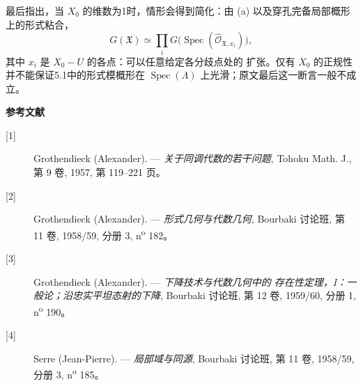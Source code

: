 最后指出，当 $X_0$ 的维数为1时，情形会得到简化：由 (a) 以及穿孔完备局部概形上的形式粘合，
\[
  G(\mathfrak X)\simeq
  \prod_iG\bigl(\operatorname{Spec}(\widehat{\mathcal O}_{\mathfrak X,x_i})\bigr),
\]
其中 $x_i$ 是 $X_0-U$ 的各点：可以任意给定各分歧点处的
扩张。仅有 $X_0$ 的正规性并不能保证5.1中的形式模概形在 $\operatorname{Spec}(\Lambda)$ 上光滑；原文最后这一断言一般不成立。

\begin{center}
  \textbf{参考文献}
\end{center}

\begin{description}
  \item[{[1]}] Grothendieck (Alexander). --- \emph{关于同调代数的若干问题},
    Tohoku Math. J., 第 9 卷, 1957, 第 119--221 页。
  \item[{[2]}] Grothendieck (Alexander). --- \emph{形式几何与代数几何},
    Bourbaki 讨论班, 第 11 卷, 1958/59, 分册 3,
    n\textsuperscript{o} 182。
  \item[{[3]}] Grothendieck (Alexander). --- \emph{下降技术与代数几何中的
    存在性定理，I：一般论；沿忠实平坦态射的下降}, Bourbaki 讨论班,
    第 12 卷, 1959/60, 分册 1, n\textsuperscript{o} 190。
  \item[{[4]}] Serre (Jean-Pierre). --- \emph{局部域与同源},
    Bourbaki 讨论班, 第 11 卷, 1958/59, 分册 3,
    n\textsuperscript{o} 185。
\end{description}
